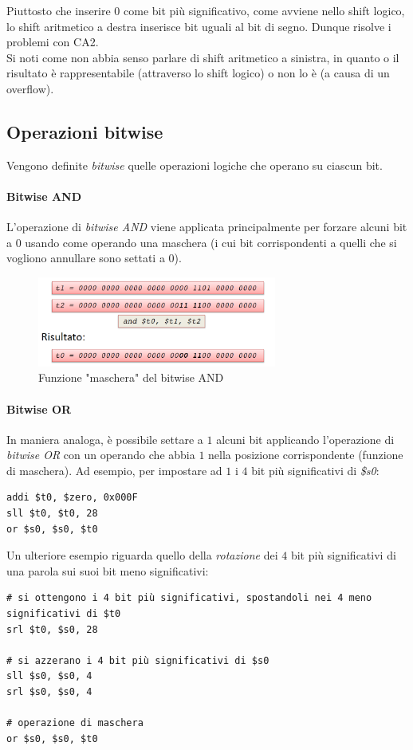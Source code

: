 \documentclass[class=book, crop=false]{standalone}
\begin{document}
Piuttosto che inserire 0 come bit più significativo, come avviene nello shift logico, lo shift aritmetico a destra inserisce bit uguali al bit di segno. Dunque risolve i problemi con CA2.\\
Si noti come non abbia senso parlare di shift aritmetico a sinistra, in quanto o il risultato è rappresentabile (attraverso lo shift logico) o non lo è (a causa di un overflow).

\subsection{Operazioni bitwise}
Vengono definite \emph{bitwise} quelle operazioni logiche che operano su ciascun bit.

\paragraph{Bitwise AND}
L'operazione di \emph{bitwise AND} viene applicata principalmente per forzare alcuni bit a 0 usando come operando una maschera (i cui bit corrispondenti a quelli che si vogliono annullare sono settati a 0).
\begin{figure}[H]
	\centering
	\includegraphics[width=0.7\textwidth,keepaspectratio]{bitwise_and}
	\caption{Funzione "maschera" del bitwise AND}
\end{figure}

\paragraph{Bitwise OR}
In maniera analoga, è possibile settare a \(1\) alcuni bit applicando l'operazione di \emph{bitwise OR} con un operando che abbia \(1\) nella posizione corrispondente (funzione di maschera). Ad esempio, per impostare ad \(1\) i \(4\) bit più significativi di \emph{\$s0}:
\begin{verbatim}
addi $t0, $zero, 0x000F
sll $t0, $t0, 28
or $s0, $s0, $t0
\end{verbatim}

Un ulteriore esempio riguarda quello della \emph{rotazione} dei \(4\) bit più significativi di una parola sui suoi bit meno significativi:
\begin{verbatim}
# si ottengono i 4 bit più significativi, spostandoli nei 4 meno significativi di $t0
srl $t0, $s0, 28

# si azzerano i 4 bit più significativi di $s0
sll $s0, $s0, 4
srl $s0, $s0, 4

# operazione di maschera
or $s0, $s0, $t0
\end{verbatim}
\end{document}
